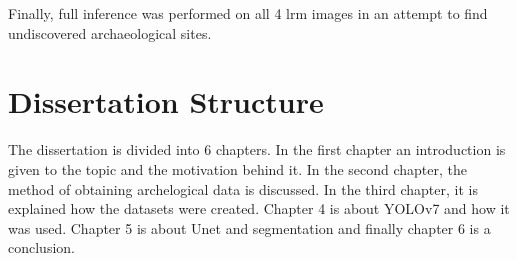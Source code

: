 Finally, full inference was performed on all 4 \ac{lrm} images in an attempt to find undiscovered archaeological sites.

\section{Dissertation Structure}
The dissertation is divided into 6 chapters. In the first chapter an introduction is given to the topic and the motivation behind it. In the second chapter, the method of obtaining archelogical data is discussed. In the third chapter, it is explained how the datasets were created. Chapter 4 is about YOLOv7 and how it was used. Chapter 5 is about Unet and segmentation and finally chapter 6 is a conclusion.
